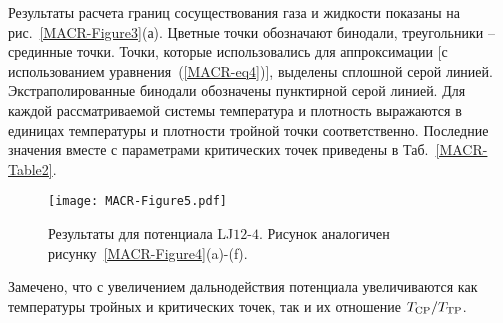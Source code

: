 Результаты расчета границ сосуществования газа и жидкости показаны на рис.~\ref{MACR-Figure3}(а).
Цветные точки обозначают бинодали, треугольники -- срединные точки.
Точки, которые использовались для аппроксимации [с использованием уравнения~(\ref{MACR-eq4})], выделены сплошной серой линией.
Экстраполированные бинодали обозначены пунктирной серой линией.
Для каждой рассматриваемой системы температура и плотность выражаются в единицах температуры и плотности тройной точки соответственно.
Последние значения вместе с параметрами критических точек приведены в Таб.~\ref{MACR-Table2}.

\begin{table}[h!]
  \caption{Значения плотностей и температур критических и тройных точек и параметры аппроксимации по уравнению~\eqref{MACR-eq4} для рассматриваемых моделей.
    Для обобщенных систем LJ температуры и плотности даны в сокращенных единицах.
    Для этана температура выражена в К, а плотность выражена в $\text{кг}/\text{м}^3$.
    Параметры критической и тройной точек для этана взяты из работы~\cite{10.1063/1.555785}.}
  \label{MACR-Table2}
\end{table}

\begin{figure}[!t]
  \centering
  \texttt{[image: MACR-Figure5.pdf]}
  \caption{Результаты для потенциала LJ$12$-$4$.
    Рисунок аналогичен рисунку~\ref{MACR-Figure4}(a)-(f).}
  \label{MACR-Figure5}
\end{figure}


Замечено, что с увеличением дальнодействия потенциала увеличиваются как температуры тройных и критических точек, так и их отношение $T_{\rm CP}/T_{\rm TP}$.

